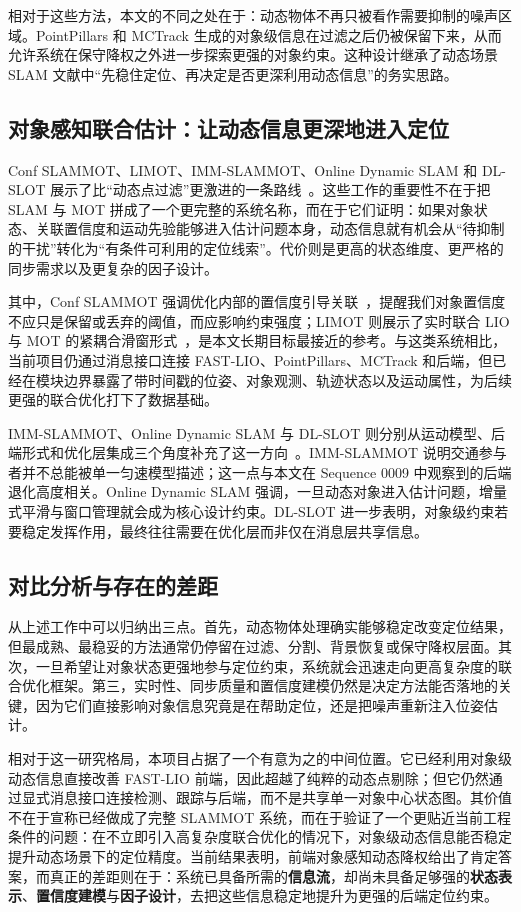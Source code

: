 \documentclass[utf8, a4paper, 12pt]{ctexart}
\begin{document}
相对于这些方法，本文的不同之处在于：动态物体不再只被看作需要抑制的噪声区域。PointPillars 和 MCTrack 生成的对象级信息在过滤之后仍被保留下来，从而允许系统在保守降权之外进一步探索更强的对象约束。这种设计继承了动态场景 SLAM 文献中“先稳住定位、再决定是否更深利用动态信息”的务实思路。

\subsection{对象感知联合估计：让动态信息更深地进入定位}
Conf SLAMMOT、LIMOT、IMM-SLAMMOT、Online Dynamic SLAM 和 DL-SLOT 展示了比“动态点过滤”更激进的一条路线~\cite{confslammot,limot,imm-slammot,online-dynamic-slam,dl-slot}。这些工作的重要性不在于把 SLAM 与 MOT 拼成了一个更完整的系统名称，而在于它们证明：如果对象状态、关联置信度和运动先验能够进入估计问题本身，动态信息就有机会从“待抑制的干扰”转化为“有条件可利用的定位线索”。代价则是更高的状态维度、更严格的同步需求以及更复杂的因子设计。

其中，Conf SLAMMOT 强调优化内部的置信度引导关联~\cite{confslammot}，提醒我们对象置信度不应只是保留或丢弃的阈值，而应影响约束强度；LIMOT 则展示了实时联合 LIO 与 MOT 的紧耦合滑窗形式~\cite{limot}，是本文长期目标最接近的参考。与这类系统相比，当前项目仍通过消息接口连接 FAST-LIO、PointPillars、MCTrack 和后端，但已经在模块边界暴露了带时间戳的位姿、对象观测、轨迹状态以及运动属性，为后续更强的联合优化打下了数据基础。

IMM-SLAMMOT、Online Dynamic SLAM 与 DL-SLOT 则分别从运动模型、后端形式和优化层集成三个角度补充了这一方向~\cite{imm-slammot,online-dynamic-slam,dl-slot}。IMM-SLAMMOT 说明交通参与者并不总能被单一匀速模型描述；这一点与本文在 Sequence 0009 中观察到的后端退化高度相关。Online Dynamic SLAM 强调，一旦动态对象进入估计问题，增量式平滑与窗口管理就会成为核心设计约束。DL-SLOT 进一步表明，对象级约束若要稳定发挥作用，最终往往需要在优化层而非仅在消息层共享信息。

\subsection{对比分析与存在的差距}
从上述工作中可以归纳出三点。首先，动态物体处理确实能够稳定改变定位结果，但最成熟、最稳妥的方法通常仍停留在过滤、分割、背景恢复或保守降权层面。其次，一旦希望让对象状态更强地参与定位约束，系统就会迅速走向更高复杂度的联合优化框架。第三，实时性、同步质量和置信度建模仍然是决定方法能否落地的关键，因为它们直接影响对象信息究竟是在帮助定位，还是把噪声重新注入位姿估计。

相对于这一研究格局，本项目占据了一个有意为之的中间位置。它已经利用对象级动态信息直接改善 FAST-LIO 前端，因此超越了纯粹的动态点剔除；但它仍然通过显式消息接口连接检测、跟踪与后端，而不是共享单一对象中心状态图。其价值不在于宣称已经做成了完整 SLAMMOT 系统，而在于验证了一个更贴近当前工程条件的问题：在不立即引入高复杂度联合优化的情况下，对象级动态信息能否稳定提升动态场景下的定位精度。当前结果表明，前端对象感知动态降权给出了肯定答案，而真正的差距则在于：系统已具备所需的\textbf{信息流}，却尚未具备足够强的\textbf{状态表示}、\textbf{置信度建模}与\textbf{因子设计}，去把这些信息稳定地提升为更强的后端定位约束。
\end{document}

